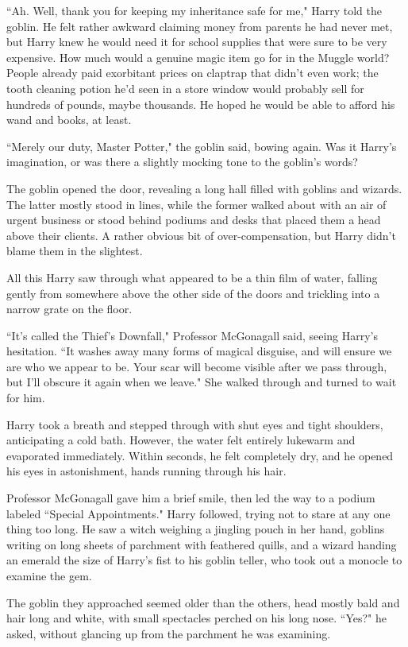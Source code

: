 ``Ah. Well, thank you for keeping my inheritance safe for me," Harry told the goblin. He felt rather awkward claiming money from parents he had never met, but Harry knew he would need it for school supplies that were sure to be very expensive. How much would a genuine magic item go for in the Muggle world? People already paid exorbitant prices on claptrap that didn't even work; the tooth cleaning potion he'd seen in a store window would probably sell for hundreds of pounds, maybe thousands. He hoped he would be able to afford his wand and books, at least.

``Merely our duty, Master Potter," the goblin said, bowing again. Was it Harry's imagination, or was there a slightly mocking tone to the goblin's words?

The goblin opened the door, revealing a long hall filled with goblins and wizards. The latter mostly stood in lines, while the former walked about with an air of urgent business or stood behind podiums and desks that placed them a head above their clients. A rather obvious bit of over-compensation, but Harry didn't blame them in the slightest.

All this Harry saw through what appeared to be a thin film of water, falling gently from somewhere above the other side of the doors and trickling into a narrow grate on the floor.

``It's called the Thief's Downfall," Professor McGonagall said, seeing Harry's hesitation. ``It washes away many forms of magical disguise, and will ensure we are who we appear to be. Your scar will become visible after we pass through, but I'll obscure it again when we leave." She walked through and turned to wait for him.

Harry took a breath and stepped through with shut eyes and tight shoulders, anticipating a cold bath. However, the water felt entirely lukewarm and evaporated immediately. Within seconds, he felt completely dry, and he opened his eyes in astonishment, hands running through his hair.

Professor McGonagall gave him a brief smile, then led the way to a podium labeled ``Special Appointments." Harry followed, trying not to stare at any one thing too long. He saw a witch weighing a jingling pouch in her hand, goblins writing on long sheets of parchment with feathered quills, and a wizard handing an emerald the size of Harry's fist to his goblin teller, who took out a monocle to examine the gem.

The goblin they approached seemed older than the others, head mostly bald and hair long and white, with small spectacles perched on his long nose. ``Yes?" he asked, without glancing up from the parchment he was examining.

